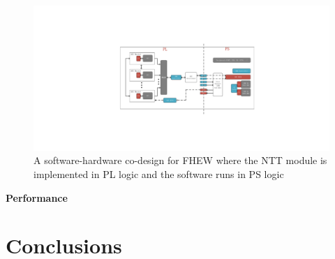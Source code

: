 \documentclass{iacrtrans}
\theoremstyle{plain}
\begin{document}
\begin{figure}[!tb]
\centering
\includegraphics[width=\textwidth]{./fig/xilinx_mpsoc.pdf}
\caption{A software-hardware co-design for FHEW where the NTT module is implemented in PL logic and the software runs in PS logic}\label{fig:mpsoc}
\end{figure}


\textbf{Performance}


\section{Conclusions}



\end{document}
